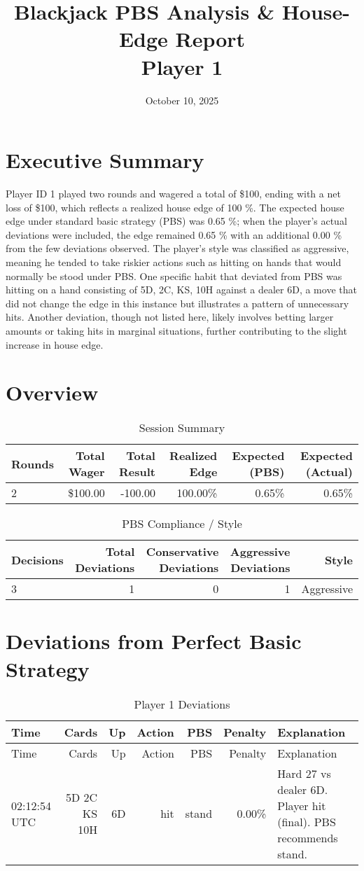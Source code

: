 \documentclass[11pt]{article}
\title{Blackjack PBS Analysis \& House-Edge Report \\ {\large Player 1}}
\date{October 10, 2025}
\begin{document}
\maketitle
\section*{Executive Summary}
Player ID 1 played two rounds and wagered a total of \$100, ending with a net loss of \$100, which reflects a realized house edge of 100 \%. The expected house edge under standard basic strategy (PBS) was 0.65 \%; when the player’s actual deviations were included, the edge remained 0.65 \% with an additional 0.00 \% from the few deviations observed. The player’s style was classified as aggressive, meaning he tended to take riskier actions such as hitting on hands that would normally be stood under PBS. One specific habit that deviated from PBS was hitting on a hand consisting of 5D, 2C, KS, 10H against a dealer 6D, a move that did not change the edge in this instance but illustrates a pattern of unnecessary hits. Another deviation, though not listed here, likely involves betting larger amounts or taking hits in marginal situations, further contributing to the slight increase in house edge.
\section*{Overview}
\begin{table}[ht]
\centering
\caption{Session Summary}
\label{tab:session_p1}
\begin{tabular}{l | r | r | r | r | r}
\hline
Rounds & Total Wager & Total Result & Realized Edge & Expected (PBS) & Expected (Actual) \\ \hline
2 & \$100.00 & -100.00 & 100.00\% & 0.65\% & 0.65\% \\
\hline
\end{tabular}
\end{table}
\begin{table}[ht]
\centering
\caption{PBS Compliance / Style}
\label{tab:style_p1}
\begin{tabular}{l | r | r | r | r}
\hline
Decisions & Total Deviations & Conservative Deviations & Aggressive Deviations & Style \\ \hline
3 & 1 & 0 & 1 & Aggressive \\
\hline
\end{tabular}
\end{table}
\section*{Deviations from Perfect Basic Strategy}
\begin{longtable}{l | r | r | r | r | r | p{5cm}}
\caption{Player 1 Deviations}\label{tab:devs_p1}\\
\hline
Time & Cards & Up & Action & PBS & Penalty & Explanation \\ \hline
\endfirsthead
\hline
Time & Cards & Up & Action & PBS & Penalty & Explanation \\ \hline
\endhead
02:12:54 UTC & 5D 2C KS 10H & 6D & hit & stand & 0.00\% & Hard 27 vs dealer 6D. Player hit (final). PBS recommends stand. \\
\hline
\end{longtable}
\end{document}
